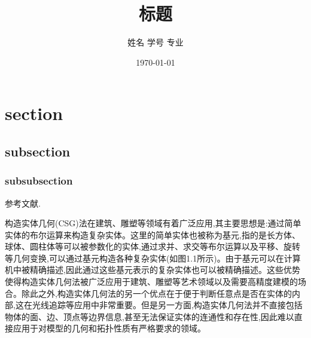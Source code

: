 \documentclass[oneside,a4paper]{article}
\title{标题}
\author{姓名 \quad 学号 \quad 专业}
\date{\today}
\begin{document}
\maketitle

\tableofcontents
\thispagestyle{empty}
\setcounter{page}{0}
\setcounter{section}{0}

\newpage

\section{section}

\subsection{subsection}

\subsubsection{subsubsection}

\indent 参考文献\cite{attene2010lightweight}.

\begin{multicols}{3}
    构造实体几何(CSG)法在建筑、雕塑等领域有着广泛应用,其主要思想是:通过简单实体的布尔运算来构造复杂实体。这里的简单实体也被称为基元,指的是长方体、球体、圆柱体等可以被参数化的实体,通过求并、求交等布尔运算以及平移、旋转等几何变换,可以通过基元构造各种复杂实体(如图1.1所示)。由于基元可以在计算机中被精确描述,因此通过这些基元表示的复杂实体也可以被精确描述。这些优势使得构造实体几何法被广泛应用于建筑、雕塑等艺术领域以及需要高精度建模的场合。除此之外,构造实体几何法的另一个优点在于便于判断任意点是否在实体的内部,这在光线追踪等应用中非常重要。但是另一方面,构造实体几何法并不直接包括物体的面、边、顶点等边界信息,甚至无法保证实体的连通性和存在性,因此难以直接应用于对模型的几何和拓扑性质有严格要求的领域。
\end{multicols}
\end{document}
